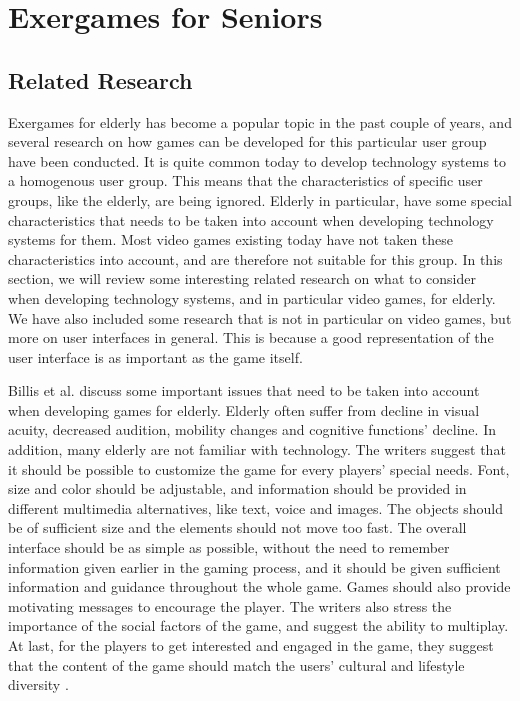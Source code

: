 \chapter{Exergames for Seniors}
\label{chap:exforseniors}

\section{Related Research}
Exergames for elderly has become a popular topic in the past couple of years, and several research on how games can be developed for this particular user group have been conducted. It is quite common today to develop technology systems to a homogenous user group. This means that the characteristics of specific user groups, like the elderly, are being ignored. Elderly in particular, have some special characteristics that needs to be taken into account when developing technology systems for them. Most video games existing today have not taken these characteristics into account, and are therefore not suitable for this group. In this section, we will review some interesting related research on what to consider when developing technology systems, and in particular video games, for elderly.  We have also included some research that is not in particular on video games, but more on user interfaces in general. This is because a good representation of the user interface is as important as the game itself.

Billis et al. \cite{Billis} discuss some important issues that need to be taken into account when developing games for elderly. Elderly often suffer from decline in visual acuity, decreased audition, mobility changes and cognitive functions' decline. In addition, many elderly are not familiar with technology. The writers suggest that it should be possible to customize the game for every players' special needs. Font, size and color should be adjustable, and information should be provided in different multimedia alternatives, like text, voice and images. The objects should be of sufficient size and the elements should not move too fast. The overall interface should be as simple as possible, without the need to remember information given earlier in the gaming process, and it should be given sufficient information and guidance throughout the whole game. Games should also provide motivating messages to encourage the player. The writers also stress the importance of the social factors of the game, and suggest the ability to multiplay. At last, for the players to get interested and engaged in the game, they suggest that the content of the game should match the users' cultural and lifestyle diversity \cite{Billis}.

